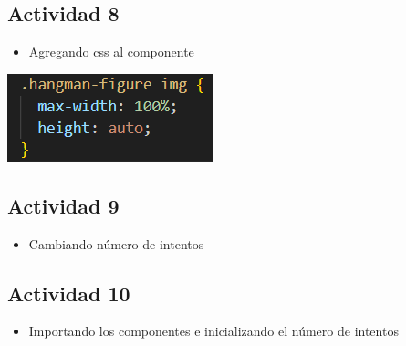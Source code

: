 \documentclass{article}
\begin{document}
    \subsection{Actividad 8}
         \begin{itemize}	
		\item Agregando css al componente
	\end{itemize}
 \centering
   \includegraphics[width=0.45\linewidth]{Actividad 8.png} 
   
      \subsection{Actividad 9}
         \begin{itemize}	
		\item Cambiando número de intentos
	\end{itemize}
     
          
     \subsection{Actividad 10}
         \begin{itemize}	
		\item Importando los componentes e inicializando el número de intentos
	\end{itemize}
    
 
\end{document}
